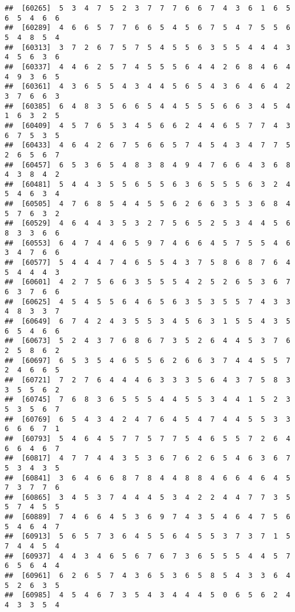 \documentclass[
]{book}
\begin{document}
\begin{verbatim}
##  [60265]  5  3  4  7  5  2  3  7  7  7  6  6  7  4  3  6  1  6  5  6  5  4  6  6
##  [60289]  4  6  6  5  7  7  6  6  5  4  5  6  7  5  4  7  5  5  6  5  4  8  5  4
##  [60313]  3  7  2  6  7  5  7  5  4  5  5  6  3  5  5  4  4  4  3  4  5  6  3  6
##  [60337]  4  4  6  2  5  7  4  5  5  5  6  4  4  2  6  8  4  6  4  4  9  3  6  5
##  [60361]  4  3  6  5  5  4  3  4  4  5  6  5  4  3  6  4  6  4  2  3  7  6  6  3
##  [60385]  6  4  8  3  5  6  6  5  4  4  5  5  5  6  6  3  4  5  4  1  6  3  2  5
##  [60409]  4  5  7  6  5  3  4  5  6  6  2  4  4  6  5  7  7  4  3  6  7  5  3  5
##  [60433]  4  6  4  2  6  7  5  6  6  5  7  4  5  4  3  4  7  7  5  2  6  5  6  7
##  [60457]  6  5  3  6  5  4  8  3  8  4  9  4  7  6  6  4  3  6  8  4  3  8  4  2
##  [60481]  5  4  4  3  5  5  6  5  5  6  3  6  5  5  5  6  3  2  4  5  4  6  3  4
##  [60505]  4  7  6  8  5  4  4  5  5  6  2  6  6  3  5  3  6  8  4  5  7  6  3  2
##  [60529]  4  6  4  4  3  5  3  2  7  5  6  5  2  5  3  4  4  5  6  8  3  3  6  6
##  [60553]  6  4  7  4  4  6  5  9  7  4  6  6  4  5  7  5  5  4  6  3  4  7  6  6
##  [60577]  5  4  4  4  7  4  6  5  5  4  3  7  5  8  6  8  7  6  4  5  4  4  4  3
##  [60601]  4  2  7  5  6  6  3  5  5  5  4  2  5  2  6  5  3  6  7  6  3  7  6  6
##  [60625]  4  5  4  5  5  6  4  6  5  6  3  5  3  5  5  7  4  3  3  4  8  3  3  7
##  [60649]  6  7  4  2  4  3  5  5  3  4  5  6  3  1  5  5  4  3  5  6  5  4  6  6
##  [60673]  5  2  4  3  7  6  8  6  7  3  5  2  6  4  4  5  3  7  6  2  5  8  6  2
##  [60697]  6  5  3  5  4  6  5  5  6  2  6  6  3  7  4  4  5  5  7  2  4  6  6  5
##  [60721]  7  2  7  6  4  4  4  6  3  3  3  5  6  4  3  7  5  8  3  3  5  5  6  2
##  [60745]  7  6  8  3  6  5  5  5  4  4  5  5  3  4  4  1  5  2  3  5  3  5  6  7
##  [60769]  6  5  4  3  4  2  4  7  6  4  5  4  7  4  4  5  5  3  3  6  6  6  7  1
##  [60793]  5  4  6  4  5  7  7  5  7  7  5  4  6  5  5  7  2  6  4  6  6  4  6  7
##  [60817]  4  7  7  4  4  3  5  3  6  7  6  2  6  5  4  6  3  6  7  5  3  4  3  5
##  [60841]  3  6  4  6  6  8  7  8  4  4  8  8  4  6  6  4  6  4  5  7  3  7  7  6
##  [60865]  3  4  5  3  7  4  4  4  5  3  4  2  2  4  4  7  7  3  5  5  7  4  5  5
##  [60889]  7  4  6  6  4  5  3  6  9  7  4  3  5  4  6  4  7  5  6  5  4  6  4  7
##  [60913]  5  6  5  7  3  6  4  5  5  6  4  5  5  3  7  3  7  1  5  7  4  4  5  4
##  [60937]  4  4  3  4  6  5  6  7  6  7  3  6  5  5  5  4  4  5  7  6  5  6  4  4
##  [60961]  6  2  6  5  7  4  3  6  5  3  6  5  8  5  4  3  3  6  4  5  2  6  3  5
##  [60985]  4  5  4  6  7  3  5  4  3  4  4  4  5  0  6  5  6  2  4  4  3  3  5  4

\end{verbatim}
\end{document}
